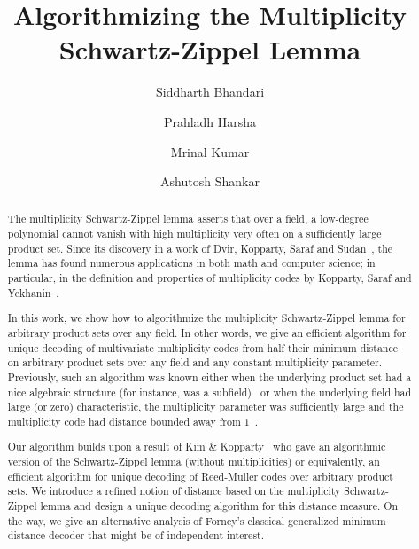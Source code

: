\documentclass{article}
\author{Siddharth Bhandari \and Prahladh Harsha \and Mrinal Kumar \and Ashutosh Shankar}\date{}
\title{Algorithmizing the Multiplicity Schwartz-Zippel Lemma}
\begin{document}
	\maketitle
	
	\begin{abstract}
		The multiplicity Schwartz-Zippel lemma asserts that over a field, a
		low-degree polynomial cannot vanish with high multiplicity very
		often on a sufficiently large product set. Since its discovery in a
		work of Dvir, Kopparty, Saraf and Sudan~\cite{DvirKSS2013}, the
		lemma has found numerous applications in both math and computer
		science; in particular, in the definition and properties of
		multiplicity codes by Kopparty, Saraf and Yekhanin~\cite{KoppartySY2014}.
		
		In this work, we show how to algorithmize the multiplicity
		Schwartz-Zippel lemma for arbitrary product sets over any field. In
		other words, we give an efficient algorithm for unique decoding of
		multivariate multiplicity codes from half their minimum distance on
		arbitrary product sets over any field and any constant multiplicity parameter. Previously, such an
		algorithm was known either when the underlying product set had a nice
		algebraic structure (for instance, was a subfield)~\cite{Kopparty2015} or when the underlying field had large (or zero)
		characteristic, the multiplicity parameter was sufficiently large
		and the multiplicity code had distance bounded away from $1$~\cite{BhandariHKS2021-mgrid}. 
		
		Our algorithm builds upon a result of Kim \& Kopparty~\cite{KimK2017} who gave an algorithmic version of the
		Schwartz-Zippel lemma (without multiplicities) or equivalently, an
		efficient algorithm for unique decoding of Reed-Muller codes over
		arbitrary product sets. We introduce a refined notion of distance based on the multiplicity Schwartz-Zippel lemma and design a unique decoding algorithm
		for this distance measure. On the way, we give an alternative analysis of
		Forney's classical generalized minimum distance decoder that might
		be of independent interest.
		
	\end{abstract}
	
\end{document}
